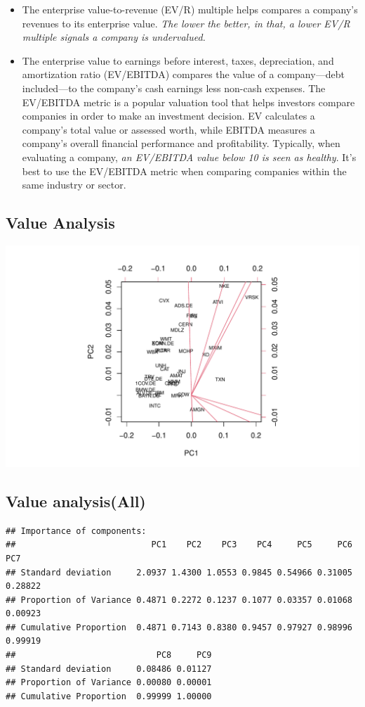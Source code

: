 \documentclass[11pt,a4paper,]{article}
\begin{document}
\begin{itemize}
\item
  The enterprise value-to-revenue (EV/R) multiple helps compares a company's revenues to its enterprise value. \emph{The lower the better, in that, a lower EV/R multiple signals a company is undervalued.}
\item
  The enterprise value to earnings before interest, taxes, depreciation, and amortization ratio (EV/EBITDA) compares the value of a company---debt included---to the company's cash earnings less non-cash expenses. The EV/EBITDA metric is a popular valuation tool that helps investors compare companies in order to make an investment decision. EV calculates a company's total value or assessed worth, while EBITDA measures a company's overall financial performance and profitability. Typically, when evaluating a company, \emph{an EV/EBITDA value below 10 is seen as healthy}. It's best to use the EV/EBITDA metric when comparing companies within the same industry or sector.
\end{itemize}

\hypertarget{value-analysis}{%
\subsection{Value Analysis}\label{value-analysis}}

\includegraphics{ass2_files/figure-latex/value-1.pdf}

\hypertarget{value-analysisall}{%
\subsection{Value analysis(All)}\label{value-analysisall}}

\begin{verbatim}
## Importance of components:
##                           PC1    PC2    PC3    PC4     PC5     PC6     PC7
## Standard deviation     2.0937 1.4300 1.0553 0.9845 0.54966 0.31005 0.28822
## Proportion of Variance 0.4871 0.2272 0.1237 0.1077 0.03357 0.01068 0.00923
## Cumulative Proportion  0.4871 0.7143 0.8380 0.9457 0.97927 0.98996 0.99919
##                            PC8     PC9
## Standard deviation     0.08486 0.01127
## Proportion of Variance 0.00080 0.00001
## Cumulative Proportion  0.99999 1.00000
\end{verbatim}
\end{document}

